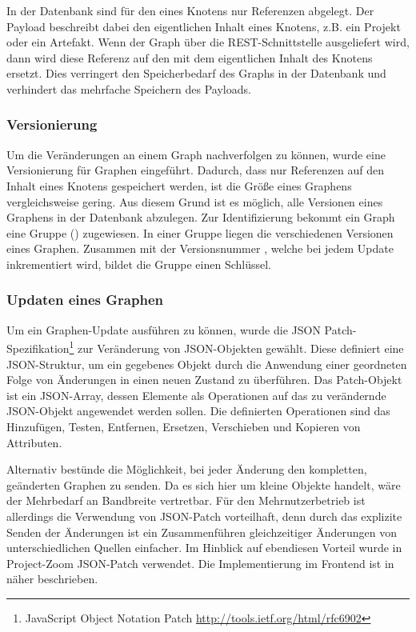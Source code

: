 In der Datenbank sind für den  eines Knotens nur Referenzen abgelegt. Der Payload beschreibt dabei den eigentlichen Inhalt eines Knotens, z.B. ein Projekt oder ein Artefakt. Wenn der Graph über die REST-Schnittstelle ausgeliefert wird, dann wird diese Referenz auf den  mit dem eigentlichen Inhalt des Knotens ersetzt. Dies verringert den Speicherbedarf des Graphs in der Datenbank und verhindert das mehrfache Speichern des Payloads.

\subsubsection{Versionierung}

Um die Veränderungen an einem Graph nachverfolgen zu können, wurde eine Versionierung für Graphen eingeführt. Dadurch, dass nur Referenzen auf den Inhalt eines Knotens gespeichert werden, ist die Größe eines Graphens vergleichsweise gering. Aus diesem Grund ist es möglich, alle Versionen eines Graphens in der Datenbank abzulegen. Zur Identifizierung bekommt ein Graph eine Gruppe () zugewiesen. In einer Gruppe liegen die verschiedenen Versionen eines Graphen. Zusammen mit der Versionsnummer , welche bei jedem Update inkrementiert wird, bildet die Gruppe einen Schlüssel.

\subsubsection{Updaten eines Graphen}

Um ein Graphen-Update ausführen zu können, wurde die JSON Patch-Spezifikation\footnote{JavaScript Object Notation Patch \url{http://tools.ietf.org/html/rfc6902}} zur Veränderung von JSON-Objekten gewählt. Diese definiert eine JSON-Struktur, um ein gegebenes Objekt durch die Anwendung einer geordneten Folge von Änderungen in einen neuen Zustand zu überführen. Das Patch-Objekt ist ein JSON-Array, dessen Elemente als Operationen auf das zu verändernde JSON-Objekt angewendet werden sollen. Die definierten Operationen sind das Hinzufügen, Testen, Entfernen, Ersetzen, Verschieben und Kopieren von Attributen.

Alternativ bestünde die Möglichkeit, bei jeder Änderung den kompletten, geänderten Graphen zu senden. Da es sich hier um kleine Objekte handelt, wäre der Mehrbedarf an Bandbreite vertretbar. Für den Mehrnutzerbetrieb ist allerdings die Verwendung von JSON-Patch vorteilhaft, denn durch das explizite Senden der Änderungen ist ein Zusammenführen gleichzeitiger Änderungen von unterschiedlichen Quellen einfacher. Im Hinblick auf ebendiesen Vorteil wurde in Project-Zoom JSON-Patch verwendet. Die Implementierung im Frontend ist in \cite{bp-norman} näher beschrieben.

